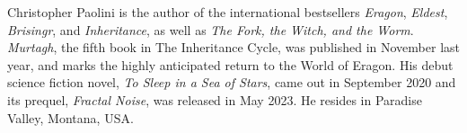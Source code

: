 Christopher Paolini is the author of the international bestsellers \emph{Eragon}, \emph{Eldest}, \emph{Brisingr}, and \emph{Inheritance}, as well as \emph{The Fork, the Witch, and the Worm}. \emph{Murtagh}, the fifth book in The Inheritance Cycle, was published in November last year, and marks the highly anticipated return to the World of Eragon. His debut science fiction novel, \emph{To Sleep in a Sea of Stars}, came out in September 2020 and its prequel, \emph{Fractal Noise}, was released in May 2023. He resides in Paradise Valley, Montana, USA.